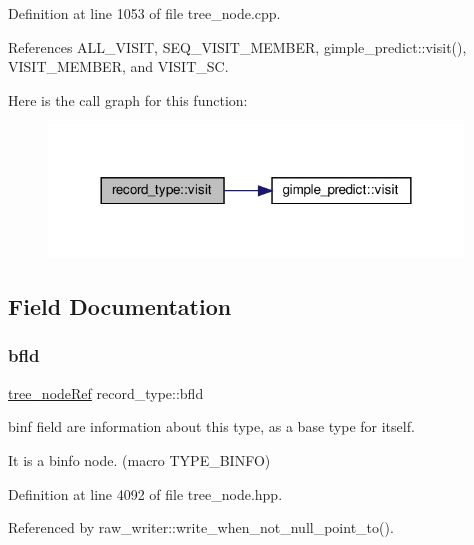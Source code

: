 Definition at line 1053 of file tree\+\_\+node.\+cpp.



References A\+L\+L\+\_\+\+V\+I\+S\+IT, S\+E\+Q\+\_\+\+V\+I\+S\+I\+T\+\_\+\+M\+E\+M\+B\+ER, gimple\+\_\+predict\+::visit(), V\+I\+S\+I\+T\+\_\+\+M\+E\+M\+B\+ER, and V\+I\+S\+I\+T\+\_\+\+SC.

Here is the call graph for this function\+:
\nopagebreak
\begin{figure}[H]
\begin{center}
\leavevmode
\includegraphics[width=312pt]{d9/d8f/structrecord__type_a4ae646f9bc555d547c8b04a89de4135a_cgraph}
\end{center}
\end{figure}


\subsection{Field Documentation}
\mbox{\label{structrecord__type_a0a483ce49d02ad7319ebc7e5e5b2a8f6}} 
\subsubsection{\texorpdfstring{bfld}{bfld}}
{\footnotesize\ttfamily \hyperlink{tree__node_8hpp_a6ee377554d1c4871ad66a337eaa67fd5}{tree\+\_\+node\+Ref} record\+\_\+type\+::bfld}



binf field are information about this type, as a base type for itself. 

It is a binfo node. (macro T\+Y\+P\+E\+\_\+\+B\+I\+N\+FO) 

Definition at line 4092 of file tree\+\_\+node.\+hpp.



Referenced by raw\+\_\+writer\+::write\+\_\+when\+\_\+not\+\_\+null\+\_\+point\+\_\+to().

\mbox{\label{structrecord__type_a8adeab31b63af188461369fc86d94b38}} 
